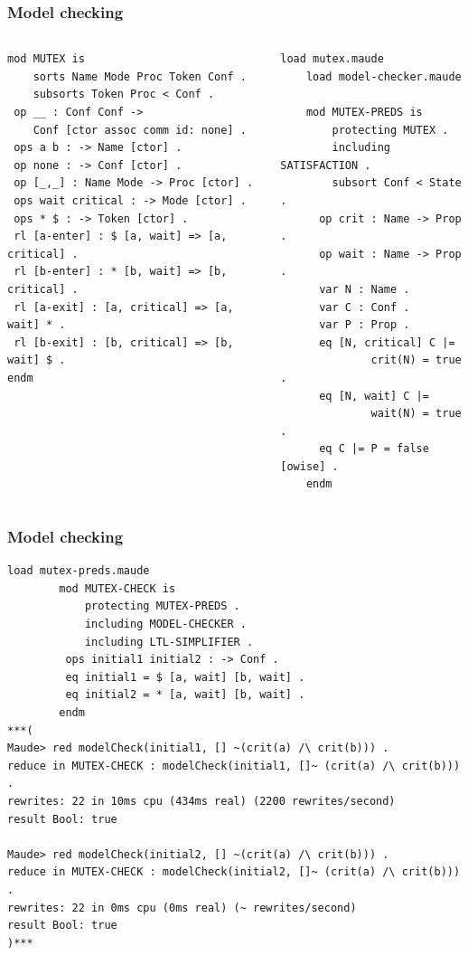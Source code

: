 \documentclass{beamer}
\begin{document}
\begin{frame}[fragile]
    \frametitle{Model checking}
    \scriptsize
    \begin{columns}
        \begin{column}{.6\textwidth}
            
            \begin{lstlisting}[language=maude]
mod MUTEX is
    sorts Name Mode Proc Token Conf .
    subsorts Token Proc < Conf .
 op __ : Conf Conf -> 
    Conf [ctor assoc comm id: none] .
 ops a b : -> Name [ctor] .
 op none : -> Conf [ctor] .
 op [_,_] : Name Mode -> Proc [ctor] .
 ops wait critical : -> Mode [ctor] .
 ops * $ : -> Token [ctor] .
 rl [a-enter] : $ [a, wait] => [a, critical] .
 rl [b-enter] : * [b, wait] => [b, critical] .
 rl [a-exit] : [a, critical] => [a, wait] * .
 rl [b-exit] : [b, critical] => [b, wait] $ .
endm
            \end{lstlisting}
        \end{column}
        \begin{column}{.4\textwidth}
            \begin{lstlisting}[language=maude]
    load mutex.maude
    load model-checker.maude
    
    mod MUTEX-PREDS is
        protecting MUTEX .
        including SATISFACTION .
        subsort Conf < State .
      op crit : Name -> Prop .
      op wait : Name -> Prop .
      var N : Name .
      var C : Conf .
      var P : Prop .
      eq [N, critical] C |= 
              crit(N) = true .
      eq [N, wait] C |=
              wait(N) = true .
      eq C |= P = false [owise] .
    endm
            \end{lstlisting}
        \end{column}
    \end{columns}
    
\end{frame}
\begin{frame}[fragile]
    \scriptsize
    \frametitle{Model checking}
    \begin{lstlisting}[language=maude]
         load mutex-preds.maude
        mod MUTEX-CHECK is
            protecting MUTEX-PREDS .
            including MODEL-CHECKER .
            including LTL-SIMPLIFIER .
         ops initial1 initial2 : -> Conf .
         eq initial1 = $ [a, wait] [b, wait] .
         eq initial2 = * [a, wait] [b, wait] .
        endm
***(
Maude> red modelCheck(initial1, [] ~(crit(a) /\ crit(b))) .
reduce in MUTEX-CHECK : modelCheck(initial1, []~ (crit(a) /\ crit(b))) .
rewrites: 22 in 10ms cpu (434ms real) (2200 rewrites/second)
result Bool: true

Maude> red modelCheck(initial2, [] ~(crit(a) /\ crit(b))) .
reduce in MUTEX-CHECK : modelCheck(initial2, []~ (crit(a) /\ crit(b))) .
rewrites: 22 in 0ms cpu (0ms real) (~ rewrites/second)
result Bool: true
)***
    \end{lstlisting}
\end{frame}
\end{document}
